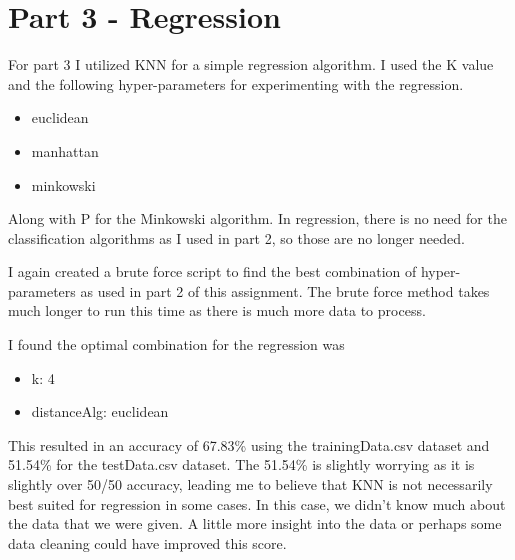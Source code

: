 \section{Part 3 - Regression}

For part 3 I utilized KNN for a simple regression algorithm. I used the K value and the following hyper-parameters for experimenting with the regression.

\begin{itemize}
  \item euclidean
  \item manhattan
  \item minkowski
\end{itemize}

Along with P for the Minkowski algorithm. In regression, there is no need for the classification algorithms as I used in part 2, so those are no longer needed.

I again created a brute force script to find the best combination of hyper-parameters as used in part 2 of this assignment. The brute force method takes much longer to run this time as there is much more data to process.

I found the optimal combination for the regression was 

\begin{itemize}
  \item k: 4
  \item distanceAlg: euclidean
\end{itemize}

This resulted in an accuracy of 67.83\% using the trainingData.csv dataset and 51.54\% for the testData.csv dataset. The 51.54\% is slightly worrying as it is slightly over 50/50 accuracy, leading me to believe that KNN is not necessarily best suited for regression in some cases. In this case, we didn't know much about the data that we were given. A little more insight into the data or perhaps some data cleaning could have improved this score.